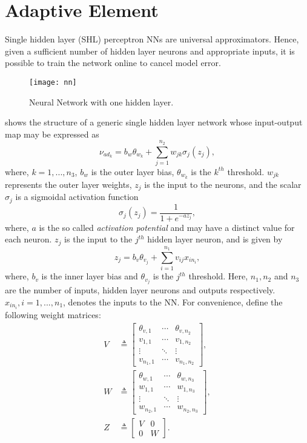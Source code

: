 \section{Adaptive Element}
\label{s:network}
Single hidden layer (SHL) perceptron NNs are
universal approximators\cite{hornik_89,spooner,lewis:ajc:99}. Hence,
given a sufficient number of hidden layer neurons and appropriate
inputs, it is possible to train the network online to cancel model
error.
%
\begin{figure}[h]
  \centering\texttt{[image: nn]}
  \caption{Neural Network with one hidden layer.}
  \label{f:nn}
\end{figure}
%
 shows the structure of a generic single hidden layer
network whose input-output map may be expressed as
\begin{equation}
\nu_{ad_k} = b_w\theta_{w_k} + \sum_{j=1}^{n_2}w_{jk}\sigma_j(z_j),
\end{equation}
where, $k=1,...,n_3$, $b_w$ is the outer layer bias,
$\theta_{w_k}$ is the $k^{th}$ threshold. $w_{jk}$ represents the
outer layer weights, $z_j$ is the input to the neurons, and the scalar $\sigma_j$ is a sigmoidal
activation function
\begin{equation}
\label{e:activation} \sigma_j(z_j) = \frac{1}{1 + e^{-az_j}},
\end{equation}
where, $a$ is the so called \emph{activation potential} and may
have a distinct value for each neuron. $z_j$ is the input to the
$j^{th}$ hidden layer neuron, and is given by
\begin{equation}
z_j = b_v\theta_{v_j} + \sum_{i=1}^{n_1}v_{ij}x_{in_i},
\end{equation}
where, $b_v$ is the inner layer bias and $\theta_{v_j}$ is the
$j^{th}$ threshold. Here, $n_1,n_2$ and $n_3$ are the number of
inputs, hidden layer neurons and outputs respectively. $x_{in_i},
i=1,...,n_1$, denotes the inputs to the NN. For convenience, define
the following weight matrices:
\begin{align}
V &\triangleq
\begin{bmatrix}
\theta_{v,1}    &     \cdots   & \theta_{v,n_2} \\
v_{1,1}         &     \cdots   & v_{1,n_2} \\
\vdots          &     \ddots   & \vdots \\
v_{n_1,1}       &     \cdots   & v_{n_1,n_2}
\end{bmatrix},  \\
W &\triangleq
\begin{bmatrix}
\theta_{w,1}    &     \cdots   & \theta_{w,n_3} \\
w_{1,1}         &     \cdots   & w_{1,n_3} \\
\vdots          &     \ddots   & \vdots \\
w_{n_2,1}       &     \cdots   & w_{n_2,n_3}
\end{bmatrix},  \\
\label{e:Z} Z &\triangleq
\begin{bmatrix}
V   &   0  \\
0   &   W
\end{bmatrix}.
\end{align}
